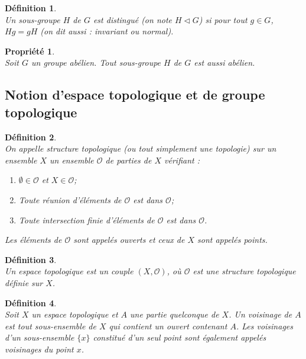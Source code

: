 \documentclass[a4paper, 14pt]{report}
\newtheorem{definition}{Définition}[section]
\newtheorem{propriety}{Propriété}[section]
\begin{document}
\begin{onehalfspace}
{			\begin{definition} \cite{ribet2004graduate}\\
Un sous-groupe \( H \) de \( G \) est distingué (on note \( H \triangleleft G \)) si pour tout \( g \in G \), \( Hg = gH \) (on dit aussi : invariant ou normal).
			\end{definition}
			
			\begin{propriety} \cite{ribet2004graduate}\\
Soit \( G \) un groupe abélien. Tout sous-groupe \( H \) de \( G \) est aussi abélien.
			\end{propriety}
			
			
			
			\subsection{Notion d'espace topologique et de groupe topologique}
			
			\begin{definition} \cite{bourbaki2013general} \\
On appelle structure \textit{topologique} (ou tout simplement une topologie) sur un ensemble \( X \) un ensemble \( \mathcal{O} \) de parties de \( X \) vérifiant :
				\begin{enumerate} [label=\roman*)]
					\item \( \emptyset \in \mathcal{O} \) et \( X \in \mathcal{O} \);
					\item Toute réunion d'éléments de \( \mathcal{O} \) est dans \( \mathcal{O} \);
					\item Toute intersection finie d'éléments de \( \mathcal{O} \) est dans \( \mathcal{O} \).
				\end{enumerate}
				Les éléments de \( \mathcal{O} \) sont appelés \textit{ouverts} et ceux de  \( X \) sont appelés \textit{points}.
			\end{definition}
			
			
			\begin{definition} \cite{bourbaki2013general} \\
Un espace topologique est un couple \( (X, \mathcal{O}) \), où \( \mathcal{O} \) est une structure topologique définie sur \( X  \).
			\end{definition}
			
			\begin{definition}  \cite{bourbaki2013general} \\
Soit \( X \) un espace topologique et \( A \) une partie quelconque de \( X \). Un voisinage de \( A \) est tout sous-ensemble de \( X \) qui contient un ouvert contenant \( A \). Les voisinages d'un sous-ensemble \( \{ x \} \) constitué d'un seul point sont également appelés voisinages du point \( x \).
			\end{definition}
			
}
\end{onehalfspace}
\end{document}
